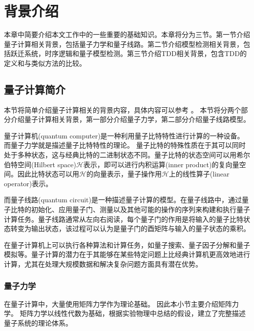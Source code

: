 \chapter{背景介绍}
本章中简要介绍本文工作中的一些重要的基础知识。本章将分为三节。第一节介绍量子计算相关背景，包括量子力学和量子线路。第二节介绍模型检测相关背景，包括跃迁系统，时序逻辑和量子模型检测。第三节介绍TDD相关背景，包含TDD的定义和与类似方法的比较。
\section{量子计算简介}
本节将简单介绍量子计算相关的背景内容，具体内容可以参考
\citep{nielsen2010quantum}。
本节将分两个部分介绍量子计算相关背景，第一部分介绍量子力学，第二部分介绍量子线路模型。

量子计算机(quantum computer)是一种利用量子比特特性进行计算的一种设备。
而量子力学就是描述量子比特特性的理论。
量子比特的特殊性质在于其可以同时处于多种状态，这与经典比特的二进制状态不同。量子比特的状态空间可以用希尔伯特空间(Hilbert space)\(\mathcal{H}\)表示\citep{nielsen2010quantum}，即可以进行内积运算(inner product)的复向量空间。因此比特状态可以用\(\mathcal{H}\)的向量表示，量子操作用\(\mathcal{H}\)上的线性算子(linear operator)表示。

而量子线路(quantum circuit)是一种描述量子计算的模型\citep{nielsen2010quantum}。在量子线路中，通过量子比特的初始化、应用量子门、测量以及其他可能的操作的序列来构建和执行量子计算任务。量子线路通常从左向右阅读，每个量子门的作用是将输入的量子比特状态转变为输出状态，该过程可以认为是量子门的酉矩阵与输入的量子状态的乘积。

在量子计算机上可以执行各种算法和计算任务，如量子搜索\citep{Grover_1996}、量子因子分解\citep{Shor}和量子模拟\citep{Feynman}等。量子计算的潜力在于其能够在某些特定问题上比经典计算机更高效地进行计算，尤其在处理大规模数据和解决复杂问题方面具有潜在优势。

\subsection{量子力学}
在量子计算中，大量使用矩阵力学作为理论基础。
因此本小节主要介绍矩阵力学。
矩阵力学以线性代数为基础，根据实验物理中总结的假设，建立了完整描述量子系统的理论体系。
